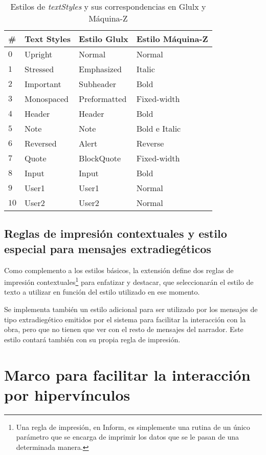 \begin{table}[]
\centering
\begin{tabular}{llll}
\hline
\textbf{\#} &\textbf{Text Styles} & \textbf{Estilo Glulx} & \textbf{Estilo Máquina-Z} \\ \hline
$0$		& Upright		& Normal		& Normal		\\
$1$		& Stressed		& Emphasized	& Italic		\\
$2$		& Important		& Subheader		& Bold			\\
$3$		& Monospaced	& Preformatted	& Fixed-width	\\
$4$		& Header		& Header		& Bold			\\
$5$		& Note			& Note			& Bold e Italic	\\
$6$		& Reversed		& Alert			& Reverse		\\
$7$		& Quote			& BlockQuote	& Fixed-width	\\
$8$		& Input			& Input			& Bold			\\
$9$		& User1			& User1			& Normal		\\
$10$	& User2			& User2			& Normal		\\ \hline
\end{tabular}
\caption{Estilos de \emph{textStyles} y sus correspondencias en Glulx y Máquina-Z}
\label{table:text-styles-estilos-basicos}
\end{table}

\subsection{Reglas de impresión contextuales y estilo especial para mensajes extradiegéticos}

Como complemento a los estilos básicos, la extensión define dos reglas de impresión contextuales\footnote{Una regla de impresión, en Inform, es simplemente una rutina de un único parámetro que se encarga de imprimir los datos que se le pasan de una determinada manera\cite{Firth:2006}.} para enfatizar y destacar, que seleccionarán el estilo de texto a utilizar en función del estilo utilizado en ese momento.

Se implementa también un estilo adicional para ser utilizado por los mensajes de tipo extradiegético emitidos por el sistema para facilitar la interacción con la obra, pero que no tienen que ver con el resto de mensajes del narrador. Este estilo contará también con su propia regla de impresión.


\section{Marco para facilitar la interacción por hipervínculos}

